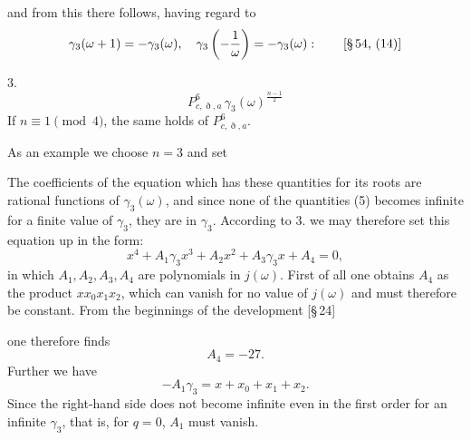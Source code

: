 and from this there follows, having regard to
\[
\gamma_3(\omega+1) = -\gamma_3(\omega), \quad
\gamma_3\left(-\frac{1}{\omega}\right) = -\gamma_3(\omega): \qquad \text{[§\,54, (14)]}
\]

3. 
\[
P^{6}_{c,\eth,a}\,\gamma_3(\omega)^{\frac{n-1}{2}}
\]
 If $n \equiv 1 \pmod{4}$, the same holds of $P^{6}_{c,\eth,a}$.

As an example we choose $n=3$ and set


The coefficients of the equation which has these quantities for its
roots are rational functions of $\gamma_3(\omega)$, and since none of
the quantities (5) becomes infinite for a finite value of $\gamma_3$,
they are  in $\gamma_3$. According to 3. we may
therefore set this equation up in the form:
\[
x^4 + A_1\gamma_3 x^3 + A_2 x^2 + A_3 \gamma_3 x + A_4 = 0,
\]
in which $A_1, A_2, A_3, A_4$ are polynomials in
$j(\omega)$. First of all one obtains $A_4$ as the product $x x_0 x_1 x_2$,
which can vanish for no value of $j(\omega)$ and must therefore be
constant. From the beginnings of the development [§\,24]


one therefore finds
\[
A_4 = -27.
\]
Further we have
\[
-A_1\gamma_3 = x + x_0 + x_1 + x_2.
\]
Since the right-hand side does not become infinite even in the first
order for an infinite $\gamma_3$, that is, for $q=0$, $A_1$ must
vanish.
